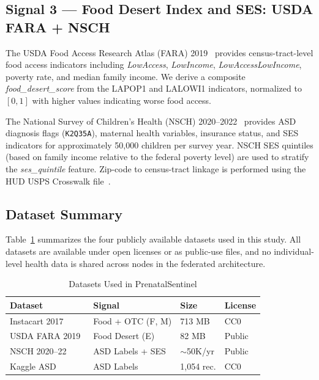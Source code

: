 \documentclass[journal]{IEEEtran}
\begin{document}
\subsection{Signal 3 --- Food Desert Index and SES: USDA FARA + NSCH}

The USDA Food Access Research Atlas (FARA) 2019~\cite{usdafara2019}
provides census-tract-level food access indicators including
\textit{LowAccess}, \textit{LowIncome}, \textit{LowAccessLowIncome},
poverty rate, and median family income. We derive a composite
\textit{food\_desert\_score} from the LAPOP1 and LALOWI1 indicators,
normalized to $[0,1]$ with higher values indicating worse food access.

The National Survey of Children's Health (NSCH) 2020--2022~\cite{nsch2022}
provides ASD diagnosis flags (\texttt{K2Q35A}), maternal health
variables, insurance status, and SES indicators for approximately
50,000 children per survey year. NSCH SES quintiles (based on
family income relative to the federal poverty level) are used to
stratify the \textit{ses\_quintile} feature. Zip-code to census-tract
linkage is performed using the HUD USPS Crosswalk file~\cite{hud2023crosswalk}.

\subsection{Dataset Summary}

Table~\ref{tab:datasets} summarizes the four publicly available
datasets used in this study. All datasets are available under
open licenses or as public-use files, and no individual-level
health data is shared across nodes in the federated architecture.

\begin{table}[t]
\centering
\caption{Datasets Used in PrenatalSentinel}
\label{tab:datasets}
\renewcommand{\arraystretch}{1.2}
\begin{tabular}{p{2.1cm} p{2.0cm} p{1.4cm} p{1.4cm}}
\toprule
\textbf{Dataset} & \textbf{Signal} & \textbf{Size} & \textbf{License} \\
\midrule
Instacart 2017~\cite{instacart2017} & Food + OTC (F, M) & 713 MB & CC0 \\
USDA FARA 2019~\cite{usdafara2019} & Food Desert (E) & 82 MB & Public \\
NSCH 2020--22~\cite{nsch2022} & ASD Labels + SES & $\sim$50K/yr & Public \\
Kaggle ASD~\cite{thabtah2019autism} & ASD Labels & 1,054 rec. & CC0 \\
\bottomrule
\end{tabular}
\end{table}
\end{document}
